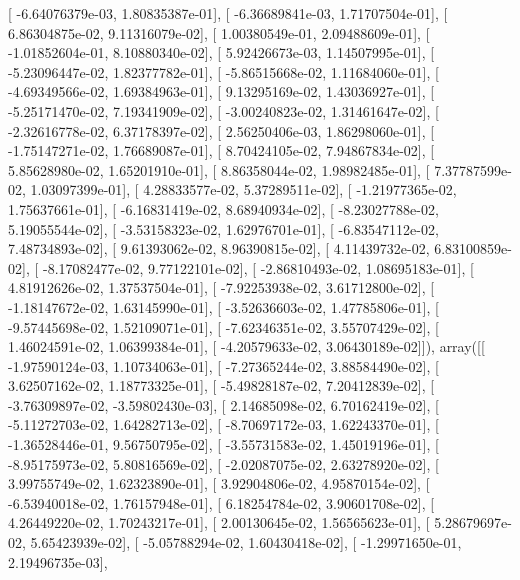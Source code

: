 \documentclass{article}
\begin{document}
       [ -6.64076379e-03,   1.80835387e-01],
       [ -6.36689841e-03,   1.71707504e-01],
       [  6.86304875e-02,   9.11316079e-02],
       [  1.00380549e-01,   2.09488609e-01],
       [ -1.01852604e-01,   8.10880340e-02],
       [  5.92426673e-03,   1.14507995e-01],
       [ -5.23096447e-02,   1.82377782e-01],
       [ -5.86515668e-02,   1.11684060e-01],
       [ -4.69349566e-02,   1.69384963e-01],
       [  9.13295169e-02,   1.43036927e-01],
       [ -5.25171470e-02,   7.19341909e-02],
       [ -3.00240823e-02,   1.31461647e-02],
       [ -2.32616778e-02,   6.37178397e-02],
       [  2.56250406e-03,   1.86298060e-01],
       [ -1.75147271e-02,   1.76689087e-01],
       [  8.70424105e-02,   7.94867834e-02],
       [  5.85628980e-02,   1.65201910e-01],
       [  8.86358044e-02,   1.98982485e-01],
       [  7.37787599e-02,   1.03097399e-01],
       [  4.28833577e-02,   5.37289511e-02],
       [ -1.21977365e-02,   1.75637661e-01],
       [ -6.16831419e-02,   8.68940934e-02],
       [ -8.23027788e-02,   5.19055544e-02],
       [ -3.53158323e-02,   1.62976701e-01],
       [ -6.83547112e-02,   7.48734893e-02],
       [  9.61393062e-02,   8.96390815e-02],
       [  4.11439732e-02,   6.83100859e-02],
       [ -8.17082477e-02,   9.77122101e-02],
       [ -2.86810493e-02,   1.08695183e-01],
       [  4.81912626e-02,   1.37537504e-01],
       [ -7.92253938e-02,   3.61712800e-02],
       [ -1.18147672e-02,   1.63145990e-01],
       [ -3.52636603e-02,   1.47785806e-01],
       [ -9.57445698e-02,   1.52109071e-01],
       [ -7.62346351e-02,   3.55707429e-02],
       [  1.46024591e-02,   1.06399384e-01],
       [ -4.20579633e-02,   3.06430189e-02]]), array([[ -1.97590124e-03,   1.10734063e-01],
       [ -7.27365244e-02,   3.88584490e-02],
       [  3.62507162e-02,   1.18773325e-01],
       [ -5.49828187e-02,   7.20412839e-02],
       [ -3.76309897e-02,  -3.59802430e-03],
       [  2.14685098e-02,   6.70162419e-02],
       [ -5.11272703e-02,   1.64282713e-02],
       [ -8.70697172e-03,   1.62243370e-01],
       [ -1.36528446e-01,   9.56750795e-02],
       [ -3.55731583e-02,   1.45019196e-01],
       [ -8.95175973e-02,   5.80816569e-02],
       [ -2.02087075e-02,   2.63278920e-02],
       [  3.99755749e-02,   1.62323890e-01],
       [  3.92904806e-02,   4.95870154e-02],
       [ -6.53940018e-02,   1.76157948e-01],
       [  6.18254784e-02,   3.90601708e-02],
       [  4.26449220e-02,   1.70243217e-01],
       [  2.00130645e-02,   1.56565623e-01],
       [  5.28679697e-02,   5.65423939e-02],
       [ -5.05788294e-02,   1.60430418e-02],
       [ -1.29971650e-01,   2.19496735e-03],
\end{document}
